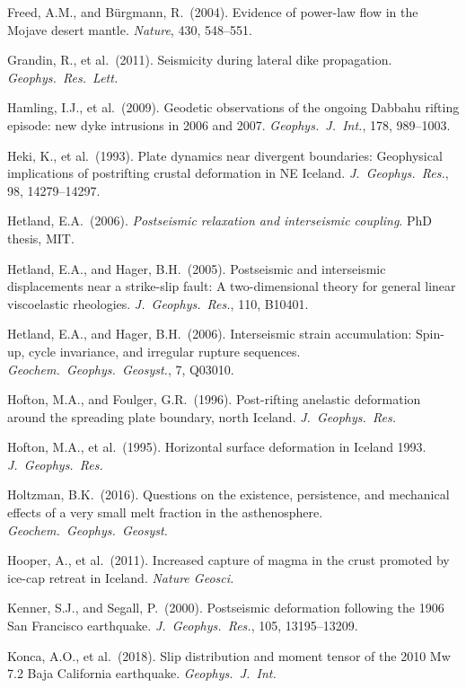 \documentclass[12pt]{article}
\begin{document}
\begin{description}
  \item Freed, A.M., and B\"{u}rgmann, R.\ (2004). Evidence of power-law flow
    in the Mojave desert mantle. \textit{Nature}, 430, 548--551.
  \item Grandin, R., et al.\ (2011). Seismicity during lateral dike
    propagation. \textit{Geophys.\ Res.\ Lett.}
  \item Hamling, I.J., et al.\ (2009). Geodetic observations of the ongoing
    Dabbahu rifting episode: new dyke intrusions in 2006 and 2007.
    \textit{Geophys.\ J.\ Int.}, 178, 989--1003.
  \item Heki, K., et al.\ (1993). Plate dynamics near divergent boundaries:
    Geophysical implications of postrifting crustal deformation in NE Iceland.
    \textit{J.\ Geophys.\ Res.}, 98, 14279--14297.
  \item Hetland, E.A.\ (2006). \textit{Postseismic relaxation and
    interseismic coupling}. PhD thesis, MIT.
  \item Hetland, E.A., and Hager, B.H.\ (2005). Postseismic and interseismic
    displacements near a strike-slip fault: A two-dimensional theory for general
    linear viscoelastic rheologies. \textit{J.\ Geophys.\ Res.}, 110, B10401.
  \item Hetland, E.A., and Hager, B.H.\ (2006). Interseismic strain
    accumulation: Spin-up, cycle invariance, and irregular rupture sequences.
    \textit{Geochem.\ Geophys.\ Geosyst.}, 7, Q03010.
  \item Hofton, M.A., and Foulger, G.R.\ (1996). Post-rifting anelastic
    deformation around the spreading plate boundary, north Iceland.
    \textit{J.\ Geophys.\ Res.}
  \item Hofton, M.A., et al.\ (1995). Horizontal surface deformation in
    Iceland 1993. \textit{J.\ Geophys.\ Res.}
  \item Holtzman, B.K.\ (2016). Questions on the existence, persistence, and
    mechanical effects of a very small melt fraction in the asthenosphere.
    \textit{Geochem.\ Geophys.\ Geosyst.}
  \item Hooper, A., et al.\ (2011). Increased capture of magma in the crust
    promoted by ice-cap retreat in Iceland. \textit{Nature Geosci.}
  \item Kenner, S.J., and Segall, P.\ (2000). Postseismic deformation
    following the 1906 San Francisco earthquake. \textit{J.\ Geophys.\ Res.},
    105, 13195--13209.
  \item Konca, A.O., et al.\ (2018). Slip distribution and moment tensor of
    the 2010 Mw 7.2 Baja California earthquake. \textit{Geophys.\ J.\ Int.}

\end{description}
\end{document}
